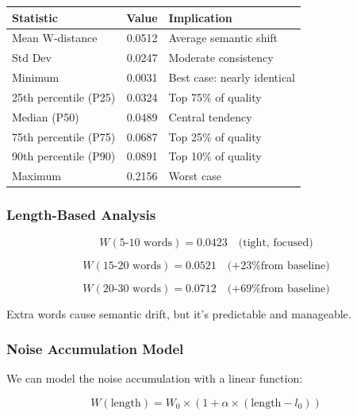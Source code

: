 \documentclass[12pt,a4paper,oneside]{report}
\begin{document}
\begin{table}[H]
\centering
\begin{tabular}{|l|r|p{5cm}|}
\hline
\textbf{Statistic} & \textbf{Value} & \textbf{Implication} \\
\hline
Mean W-distance & 0.0512 & Average semantic shift \\
\hline
Std Dev & 0.0247 & Moderate consistency \\
\hline
Minimum & 0.0031 & Best case: nearly identical \\
\hline
25th percentile (P25) & 0.0324 & Top 75\% of quality \\
\hline
Median (P50) & 0.0489 & Central tendency \\
\hline
75th percentile (P75) & 0.0687 & Top 25\% of quality \\
\hline
90th percentile (P90) & 0.0891 & Top 10\% of quality \\
\hline
Maximum & 0.2156 & Worst case \\
\hline
\end{tabular}
\end{table}

\subsubsection{Length-Based Analysis}

\begin{equation}
W(\text{5-10 words}) = 0.0423 \quad \text{(tight, focused)}
\end{equation}

\begin{equation}
W(\text{15-20 words}) = 0.0521 \quad \text{(+23\% from baseline)}
\end{equation}

\begin{equation}
W(\text{20-30 words}) = 0.0712 \quad \text{(+69\% from baseline)}
\end{equation}

Extra words cause semantic drift, but it's predictable and manageable.

\subsubsection{Noise Accumulation Model}

We can model the noise accumulation with a linear function:

\begin{equation}
W(\text{length}) = W_0 \times (1 + \alpha \times (\text{length} - l_0))
\end{equation}
\end{document}
